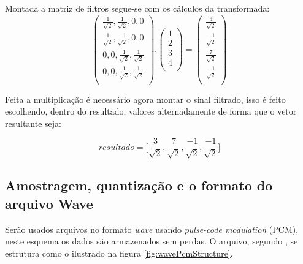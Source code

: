 \documentclass[a4paper,12pt,openright,oneside]{book}
\newenvironment{myenv}[1]
  {\begin{spacing}{#1}}
  {\end{spacing}}
\begin{document}
\begin{myenv}{1.5}
				\par Montada a matriz de filtros segue-se com os cálculos da transformada:
				\begin{equation}
					\begin{pmatrix}
						\frac{1}{\sqrt{2}}, \frac{1}{\sqrt{2}}, 0, 0\\
						\frac{1}{\sqrt{2}}, \frac{-1}{\sqrt{2}}, 0, 0\\
						0, 0, \frac{1}{\sqrt{2}}, \frac{1}{\sqrt{2}}\\
						0, 0, \frac{1}{\sqrt{2}}, \frac{1}{\sqrt{2}}\\
					\end{pmatrix} 
					.
					\begin{pmatrix}
						1\\
						2\\
						3\\
						4\\
					\end{pmatrix} 
					=
					\begin{pmatrix}
						\frac{3}{\sqrt{2}}\\
						\frac{-1}{\sqrt{2}}\\
						\frac{7}{\sqrt{2}}\\
						\frac{-1}{\sqrt{2}}\\
					\end{pmatrix}
				\end{equation}
				
				\par Feita a multiplicação é necessário agora montar o sinal filtrado, isso é feito escolhendo, dentro do resultado, valores alternadamente de forma que o vetor resultante seja:

				\begin{equation}
					resultado = \Big[
					\frac{3}{\sqrt{2}},
					\frac{7}{\sqrt{2}},
					\frac{-1}{\sqrt{2}},
					\frac{-1}{\sqrt{2}}
					\Big]
				\end{equation}
			
				\subsection{Amostragem, quantização e o formato do arquivo Wave}
					\par Serão usados arquivos no formato \textit{wave} usando \textit{pulse-code modulation} (PCM), neste esquema os dados são armazenados sem perdas. O arquivo, segundo \cite{WAVE2019}, se estrutura como o ilustrado na figura \ref{fig:wavePcmStructure}.
					

\end{myenv}
\end{document}
